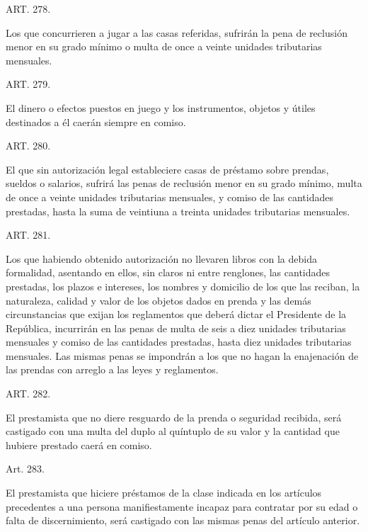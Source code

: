     ART. 278.

    Los que concurrieren a jugar a las casas referidas, sufrirán la pena de reclusión menor en su grado mínimo o multa de once a veinte unidades tributarias mensuales.










    ART. 279.

    El dinero o efectos puestos en juego y los instrumentos, objetos y útiles destinados a él caerán siempre en comiso.


    ART. 280.

    El que sin autorización legal estableciere casas de préstamo sobre prendas, sueldos o salarios, sufrirá las penas de reclusión menor en su grado mínimo, multa de once a veinte unidades tributarias mensuales, y comiso de las cantidades prestadas, hasta la suma de veintiuna a treinta unidades tributarias mensuales.







    ART. 281.

    Los que habiendo obtenido autorización no llevaren libros con la debida formalidad, asentando en ellos, sin claros ni entre renglones, las cantidades prestadas, los plazos e intereses, los nombres y domicilio de los que las reciban, la naturaleza, calidad y valor de los objetos dados en prenda y las demás circunstancias que exijan los reglamentos que deberá dictar el Presidente de la República, incurrirán en las penas de multa de seis a diez unidades tributarias mensuales y comiso de las cantidades prestadas, hasta diez unidades tributarias mensuales.
    Las mismas penas se impondrán a los que no hagan la enajenación de las prendas con arreglo a las leyes y reglamentos.





    ART. 282.

    El prestamista que no diere resguardo de la prenda o seguridad recibida, será castigado con una multa del duplo al quíntuplo de su valor y la cantidad que hubiere prestado caerá en comiso.


    Art. 283.

    El prestamista que hiciere préstamos de la clase indicada en los artículos precedentes a una persona manifiestamente incapaz para contratar por su edad o falta de discernimiento, será castigado con las mismas penas del artículo anterior.


